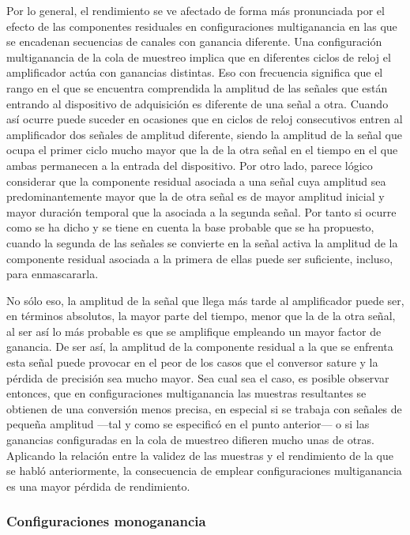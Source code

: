 Por lo general, el rendimiento se ve afectado de forma más pronunciada por
el efecto de las componentes residuales en configuraciones multiganancia en
las que se encadenan secuencias de canales con ganancia diferente. Una
configuración multiganancia de la cola de muestreo implica que en
diferentes ciclos de reloj el amplificador actúa con ganancias distintas.
Eso con frecuencia significa que el rango en el que se encuentra
comprendida la amplitud de las señales que están entrando al dispositivo de
adquisición es diferente de una señal a otra. Cuando así ocurre puede
suceder en ocasiones que en ciclos de reloj consecutivos entren al
amplificador dos señales de amplitud diferente, siendo la amplitud de la
señal que ocupa el primer ciclo mucho mayor que la de la otra señal en el
tiempo en el que ambas permanecen a la entrada del dispositivo. Por otro
lado, parece lógico considerar que la componente residual asociada a una
señal cuya amplitud sea predominantemente mayor que la de otra señal es de
mayor amplitud inicial y mayor duración temporal que la asociada a la
segunda señal. Por tanto si ocurre como se ha dicho y se tiene en cuenta la
base probable que se ha propuesto, cuando la segunda de las señales se
convierte en la señal activa la amplitud de la componente residual asociada
a la primera de ellas puede ser suficiente, incluso, para enmascararla.

No sólo eso, la amplitud de la señal que llega más tarde al amplificador
puede ser, en términos absolutos, la mayor parte del tiempo, menor que la
de la otra señal, al ser así lo más probable es que se amplifique empleando
un mayor factor de ganancia. De ser así, la amplitud de la componente
residual a la que se enfrenta esta señal puede provocar en el peor de los
casos que el conversor sature y la pérdida de precisión sea mucho mayor.
Sea cual sea el caso, es posible observar entonces, que en configuraciones
multiganancia las muestras resultantes se obtienen de una conversión menos
precisa, en especial si se trabaja con señales de pequeña amplitud ---tal y
como se especificó en el punto anterior--- o si las ganancias configuradas
en la cola de muestreo difieren mucho unas de otras. Aplicando la relación
entre la validez de las muestras y el rendimiento de la que se habló
anteriormente, la consecuencia de emplear configuraciones multiganancia es
una mayor pérdida de rendimiento.


\subsubsection{Configuraciones monoganancia}

